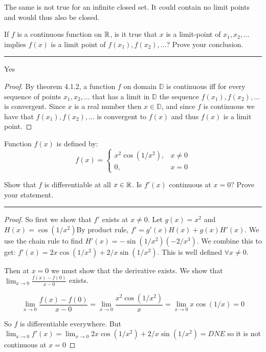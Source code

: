 \documentclass[11pt]{article}
\begin{document}
The same is not true for an infinite closed set. It could contain no limit points and would thus also be closed.






If $f$ is a continuous function on $\mathbb{R}$, is it true that $x$ is a limit-point of $x_1, x_2, ...$ implies $f(x)$ is a limit point of $f(x_1), f(x_2), ...$? Prove your conclusion.

\hrule

Yes

\begin{proof}


By theorem 4.1.2, a function $f$ on domain $\mathbb{D}$ is continuous iff for every sequence of points $x_1, x_2, ...$ that has a limit in $\mathbb{D}$ the sequence $f(x_1), f(x_2), ...$ is convergent. 
Since $x$ is a real number then $x \in \mathbb{D}$, 
and since $f$ is continuous we have that $f(x_1), f(x_2),...$ is convergent to $f(x)$ and thus $f(x)$ is a limit point.



\end{proof}





Function $f(x)$ is defined by:
$$f(x) = \begin{cases}
x^2 \cos(1/x^2), & x \neq 0\\
0, & x = 0
\end{cases}$$

Show that $f$ is differentiable at all $x \in \mathbb{R}$. Is $f'(x)$ continuous at $x = 0$? Prove your statement.

\hrule

\begin{proof}

So first we show that $f'$ exists at $x \neq 0$. Let $g(x) = x^2$ and $H(x) = \cos(1/x^2)$By product rule, $f' = g'(x)H(x) + g(x)H'(x)$. 
We use the chain rule to find $H'(x) = - \sin(1/x^2) (-2/x^3)$. 
We combine this to get: $f'(x) = 2x \cos (1/x^2) + 2/x \sin(1/x^2)$.
This is well defined $\forall x \neq 0$. 

Then at $x = 0$ we must show that the derivative exists. We show that $\lim_{x \to 0} \frac{f(x) - f(0)}{x - 0}$ exists. 

$$\lim_{x \to 0} \frac{f(x) - f(0)}{x - 0} = \lim_{x \to 0} \frac{x^2 \cos(1/x^2)}{x} =  \lim_{x \to 0} x \cos(1/x) = 0$$

So $f$ is differentiable everywhere. But $\lim_{x \to 0} f'(x) = \lim_{x \to 0} 2x \cos (1/x^2) + 2/x \sin(1/x^2) = DNE$ so it is not continuous at $x = 0$

\end{proof}	
\end{document}
